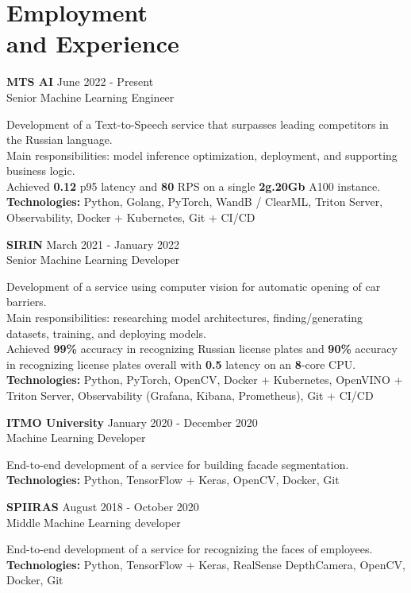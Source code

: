 \section{\sc Employment \\and Experience}
\vspace{2.6pt}

\textbf{MTS AI} \hfill June 2022 - Present \\
Senior Machine Learning Engineer

Development of a Text-to-Speech service that surpasses leading competitors in the Russian language. \\
Main responsibilities: model inference optimization, deployment, and supporting business logic. \\
Achieved \textbf{0.12} p95 latency and \textbf{80} RPS on a single \textbf{2g.20Gb} A100 instance. \\
\textbf{Technologies:} Python, Golang, PyTorch, WandB / ClearML, Triton Server, Observability, Docker + Kubernetes, Git + CI/CD

\textbf{SIRIN} \hfill March 2021 - January 2022 \\
Senior Machine Learning Developer

Development of a service using computer vision for automatic opening of car barriers. \\
Main responsibilities: researching model architectures, finding/generating datasets, training, and deploying models. \\
Achieved \textbf{99\%} accuracy in recognizing Russian license plates and \textbf{90\%} accuracy in recognizing license plates overall with \textbf{0.5} latency on an \textbf{8}-core CPU. \\
\textbf{Technologies:} Python, PyTorch, OpenCV, Docker + Kubernetes, OpenVINO + Triton Server, Observability (Grafana, Kibana, Prometheus), Git + CI/CD

\textbf{ITMO University} \hfill January 2020 - December 2020 \\
Machine Learning Developer

End-to-end development of a service for building facade segmentation. \\
\textbf{Technologies:} Python, TensorFlow + Keras, OpenCV, Docker, Git

\textbf{SPIIRAS} \hfill August 2018 - October 2020 \\
Middle Machine Learning developer

End-to-end development of a service for recognizing the faces of employees. \\
\textbf{Technologies:} Python, TensorFlow + Keras, RealSense DepthCamera, OpenCV, Docker, Git

\endinput

